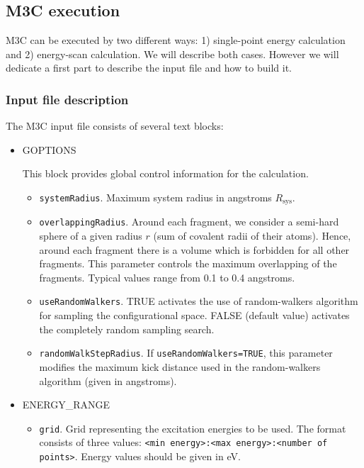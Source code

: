 \documentclass[a4paper,12pt]{article}
\begin{document}
\subsection{M3C execution}

M3C can be executed by two different ways: 1) single-point energy calculation and 2) energy-scan calculation. We will describe both cases. However we will 
dedicate a first part to describe the input file and how to build it.

\subsubsection{Input file description}

The M3C input file consists of several text blocks:

\begin{itemize}
\item GOPTIONS

This block provides global control information for
the calculation.
\begin{itemize}
\item \texttt{systemRadius}. Maximum system radius in angstroms $R_{\text{sys}}$.
\item \texttt{overlappingRadius}. Around each fragment, we consider
a semi-hard sphere of a given radius $r$ (sum of covalent radii of their atoms). Hence, around each fragment there is a 
volume which is forbidden for all other fragments. This parameter controls the maximum overlapping of the 
fragments. Typical values range from 0.1 to 0.4 angstroms.
\item \texttt{useRandomWalkers}. TRUE activates the use of random-walkers algorithm for sampling the configurational 
space. FALSE (default value) activates the completely random sampling search.
\item \texttt{randomWalkStepRadius}. If \texttt{useRandomWalkers=TRUE}, this parameter modifies the maximum kick 
distance used in the random-walkers algorithm (given in angstroms).
\end{itemize}

\item ENERGY\_RANGE
\begin{itemize}
\item \texttt{grid}. Grid representing the excitation energies to be used. The format consists of three values: 
\texttt{<min energy>:<max energy>:<number of points>}. Energy values should be given in eV.
\end{itemize}


\end{itemize}
\end{document}
